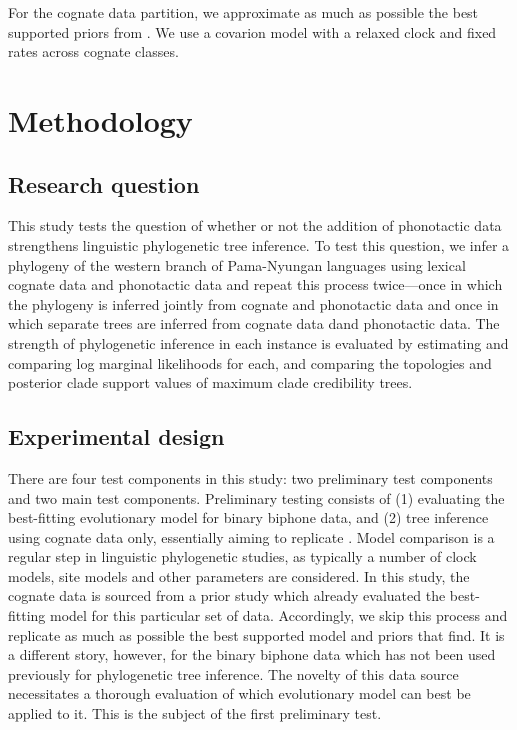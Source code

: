 \documentclass[]{article}
\begin{document}
For the cognate data partition, we approximate as much as possible the best supported priors from \textcite{bouckaert_origin_2018}. We use a covarion model with a relaxed clock and fixed rates across cognate classes.

\hypertarget{methodology}{%
\section{Methodology}\label{methodology}}

\hypertarget{research-question}{%
\subsection{Research question}\label{research-question}}

This study tests the question of whether or not the addition of phonotactic data strengthens linguistic phylogenetic tree inference. To test this question, we infer a phylogeny of the western branch of Pama-Nyungan languages using lexical cognate data and phonotactic data and repeat this process twice---once in which the phylogeny is inferred jointly from cognate and phonotactic data and once in which separate trees are inferred from cognate data dand phonotactic data. The strength of phylogenetic inference in each instance is evaluated by estimating and comparing log marginal likelihoods for each, and comparing the topologies and posterior clade support values of maximum clade credibility trees.

\hypertarget{experimental-design}{%
\subsection{Experimental design}\label{experimental-design}}

There are four test components in this study: two preliminary test components and two main test components. Preliminary testing consists of (1) evaluating the best-fitting evolutionary model for binary biphone data, and (2) tree inference using cognate data only, essentially aiming to replicate \textcite{bouckaert_origin_2018}. Model comparison is a regular step in linguistic phylogenetic studies, as typically a number of clock models, site models and other parameters are considered. In this study, the cognate data is sourced from a prior study \autocite{bouckaert_origin_2018} which already evaluated the best-fitting model for this particular set of data. Accordingly, we skip this process and replicate as much as possible the best supported model and priors that \textcite{bouckaert_origin_2018} find. It is a different story, however, for the binary biphone data which has not been used previously for phylogenetic tree inference. The novelty of this data source necessitates a thorough evaluation of which evolutionary model can best be applied to it. This is the subject of the first preliminary test.
\end{document}
